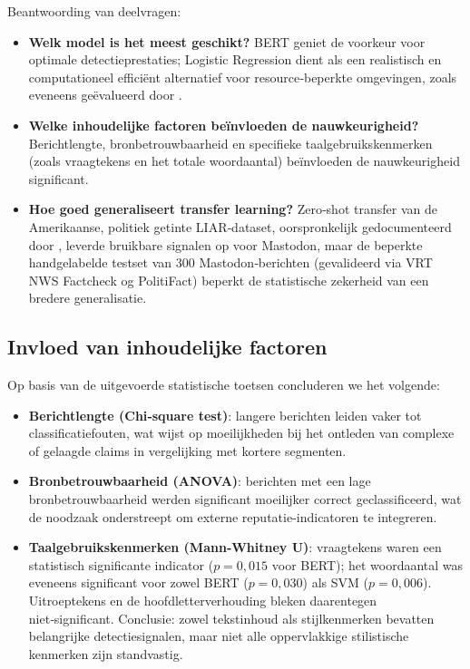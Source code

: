 Beantwoording van deelvragen:
\begin{itemize}
  \item \textbf{Welk model is het meest geschikt?} BERT geniet de voorkeur voor optimale detectieprestaties; Logistic Regression dient als een realistisch en computationeel efficiënt alternatief voor resource‑beperkte omgevingen, zoals eveneens geëvalueerd door \textcite{Khatri2025}.
  \item \textbf{Welke inhoudelijke factoren beïnvloeden de nauwkeurigheid?} Berichtlengte, bronbetrouwbaarheid en specifieke taalgebruikskenmerken (zoals vraagtekens en het totale woordaantal) beïnvloeden de nauwkeurigheid significant.
  \item \textbf{Hoe goed generaliseert transfer learning?} Zero‑shot transfer van de Amerikaanse, politiek getinte LIAR‑dataset, oorspronkelijk gedocumenteerd door \textcite{Wang2017}, leverde bruikbare signalen op voor Mastodon, maar de beperkte handgelabelde testset van 300 Mastodon‑berichten (gevalideerd via VRT NWS Factcheck og PolitiFact) beperkt de statistische zekerheid van een bredere generalisatie.
\end{itemize}

\subsection{Invloed van inhoudelijke factoren}
Op basis van de uitgevoerde statistische toetsen concluderen we het volgende:
\begin{itemize}
  \item \textbf{Berichtlengte (Chi‑square test)}: langere berichten leiden vaker tot classificatiefouten, wat wijst op moeilijkheden bij het ontleden van complexe of gelaagde claims in vergelijking met kortere segmenten.
  \item \textbf{Bronbetrouwbaarheid (ANOVA)}: berichten met een lage bronbetrouwbaarheid werden significant moeilijker correct geclassificeerd, wat de noodzaak onderstreept om externe reputatie-indicatoren te integreren.
  \item \textbf{Taalgebruikskenmerken (Mann‑Whitney U)}: vraagtekens waren een statistisch significante indicator ($p = 0{,}015$ voor BERT); het woordaantal was eveneens significant voor zowel BERT ($p = 0{,}030$) als SVM ($p = 0{,}006$). Uitroeptekens en de hoofdletterverhouding bleken daarentegen niet‑significant. Conclusie: zowel tekstinhoud als stijlkenmerken bevatten belangrijke detectiesignalen, maar niet alle oppervlakkige stilistische kenmerken zijn standvastig.
\end{itemize}

